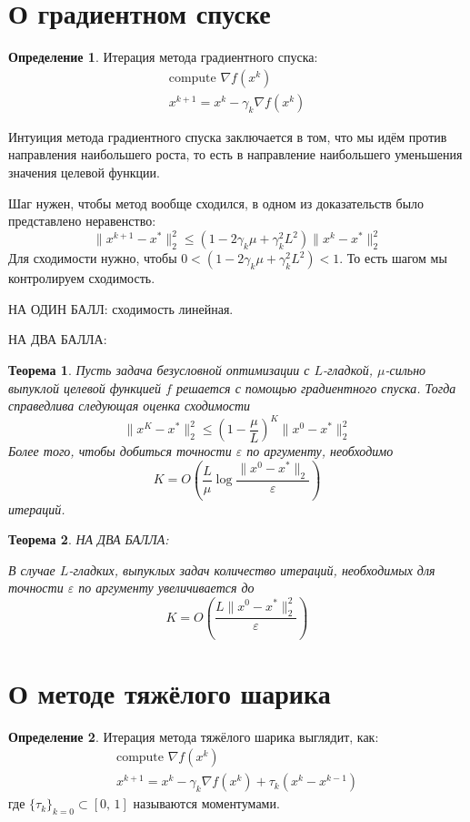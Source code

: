 \documentclass[a4paper,12pt]{article}
\renewcommand{\leq}{\ensuremath{\leqslant}}
\theoremstyle{plain}
\newtheorem{theorem}{Теорема}[section]
\theoremstyle{definition}
\newtheorem{definition}{Определение}[section]
\theoremstyle{remark}
\begin{document}
\section{О градиентном спуске}
\begin{definition}
	Итерация метода градиентного спуска:
	\begin{align*}
		\text{compute }\nabla f(x^k) \\
		x^{k + 1} = x^k - \gamma_k\nabla f(x^k)
	\end{align*}
\end{definition}

Интуиция метода градиентного спуска заключается в том, что мы идём против направления наибольшего роста, то есть в направление наибольшего уменьшения значения целевой функции.

Шаг нужен, чтобы метод вообще сходился, в одном из доказательств было представлено неравенство:
\[
	\|x^{k + 1} - x^*\|_2^2 \leq (1 - 2\gamma_k\mu + \gamma_k^2L^2)\|x^k - x^*\|_2^2
\]
Для сходимости нужно, чтобы $0 < (1 - 2\gamma_k\mu + \gamma_k^2L^2) < 1$. То есть шагом мы контролируем сходимость.

НА ОДИН БАЛЛ: сходимость линейная.

НА ДВА БАЛЛА:
\begin{theorem}
	Пусть задача безусловной оптимизации с $L$-гладкой, $\mu$-сильно выпуклой целевой функцией $f$ решается с помощью градиентного спуска. Тогда справедлива следующая оценка сходимости
	\[
		\|x^K - x^*\|_2^2 \leq \left(1 - \frac{\mu}{L}\right)^K\|x^0 - x^*\|_2^2
	\]
	Более того, чтобы добиться точности $\varepsilon$ по аргументу, необходимо
	\[
		K = O\left(\frac{L}{\mu}\log\frac{\|x^0 - x^*\|_2}{\varepsilon}\right)
	\]
	итераций.
\end{theorem}

\begin{theorem}
	НА ДВА БАЛЛА:

	В случае $L$-гладких, выпуклых задач количество итераций, необходимых для точности $\varepsilon$ по аргументу увеличивается до
	\[
		K = O\left(\frac{L\|x^0 - x^*\|_2^2}{\varepsilon}\right)
	\]
\end{theorem}

\section{О методе тяжёлого шарика}
\begin{definition}
	Итерация метода тяжёлого шарика выглядит, как:
	\begin{align*}
		\text{compute }\nabla f(x^k) \\
		x^{k + 1} = x^k - \gamma_k\nabla f(x^k) + \tau_k(x^k - x^{k - 1})
	\end{align*}
	где $\{\tau_k\}_{k = 0} \subset [0,\, 1]$ называются моментумами.
\end{definition}
\end{document}
